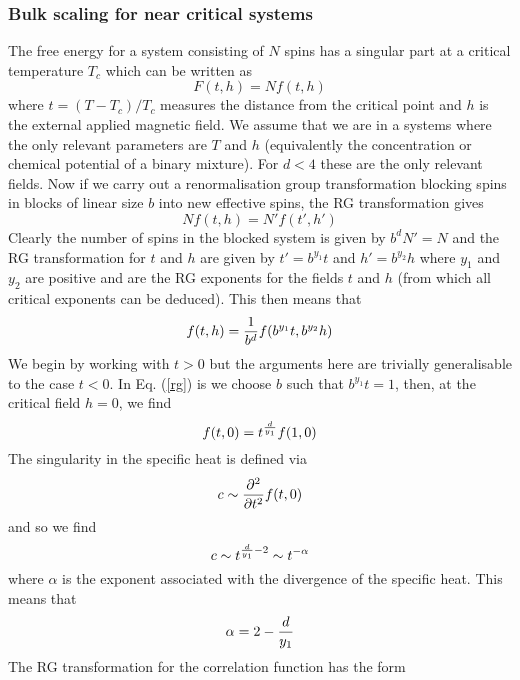 \subsubsection{Bulk scaling for near critical systems}
The free energy for a system consisting of $N$  spins has a singular part at a critical temperature $T_c$ which can be written as
\begin{equation}
F(t,h) = N f(t,h)
\end{equation}
where $t = (T-T_c)/ T_c$ measures the distance from the critical point and $h$ is the external applied magnetic field. We assume that we are in a systems where the only relevant parameters are $T$ and $h$ (equivalently the concentration or chemical potential 
of a binary mixture). For $d<4$ these are the only relevant fields.
Now if we carry out a renormalisation group transformation
blocking spins in blocks of linear size $b$ into new effective spins, the RG transformation
gives
\begin{equation}
N f(t,h) = N'f(t',h')
\end{equation}
Clearly the number of spins in the blocked system is given by $b^d N'=N$ and the RG transformation for $t$ and $h$ are given by $t' = b^{y_1} t$ and $h' = b^{y_2}h$ where $y_1$ and $y_2$ are positive and are the RG exponents for the fields $t$ and $h$ (from which all critical exponents can be deduced). This then means that
\begin{equation}
f(t,h) = {1\over b^d}f(b^{y_1} t,  b^{y_2} h)\label{rg}
\end{equation}
We begin by working  with $t>0$ but the arguments here are trivially generalisable to the case $t<0$. In Eq. (\ref{rg}) is we choose $b$ such that $b^{y_1}t=1$, then, at the critical field $h=0$, we find
\begin{equation}
f(t,0) = t^{d\over y_1} f(1,0)
\end{equation}
The singularity in the specific heat is defined via
\begin{equation}
c\sim {\partial^2 \over \partial t^2}f(t,0)
\end{equation}
and so we find
\begin{equation}
c\sim t^{{d\over y_1}-2} \sim t^{-\alpha}
\end{equation}
where $\alpha$ is the exponent associated with the divergence of the specific heat. This means that
\begin{equation}
\alpha = 2 -{d\over y_1}
\end{equation}
The RG transformation for the correlation function has the form
